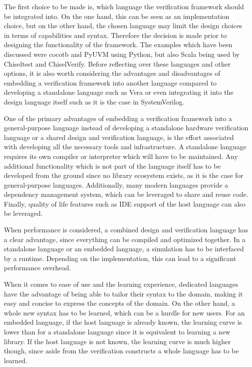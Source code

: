 The first choice to be made is, which language the verification framework should be integrated into. On the one hand,
this can be seen as an implementation choice, but on the other hand, the chosen language may limit the design choices
in terms of capabilities and syntax. Therefore the decision is made prior to designing the functionality of the
framework. The examples
which have been discussed were cocotb and PyUVM using Python, but also Scala being used by Chiseltest and
ChiselVerify. Before reflecting over these languages and other options, it is also worth considering the advantages
and disadvantages of embedding a verification framework into another language compared to developing a standalone
language such as Vera or even integrating it into the design language itself such as it is the case in SystemVerilog.

One of the primary advantages of embedding a verification framework into a general-purpose language instead of
developing a standalone hardware verification language or a shared design and verification language, is the effort
associated with developing all the necessary tools and infrastructure. A standalone language requires its own
compiler or interpreter which will have to be maintained. Any additional functionality which is not part of the
language itself has to be developed from the ground since no library ecosystem exists, as it is the case for
general-purpose languages. Additionally, many modern languages provide a dependency management system, which can be
leveraged to share and reuse code. Finally, quality of life features such as IDE support of the host language can
also be leveraged.

When performance is considered, a combined design and verification language has a clear advantage, since everything
can be compiled and optimized together. In a standalone language or an embedded language, a simulation has to be
interfaced by a runtime. Depending on the implementation, this can lead to a significant performance overhead.

When it comes to ease of use and the learning experience, dedicated languages have the advantage of being able to
tailor their syntax to the domain, making it easy and concise to express the concepts of the domain. On the other
hand, a whole new syntax has to be learned, which can be a hurdle for new users. For an embedded language, if the
host language is already known, the learning curve is lower than for a standalone language since it is equivalent to
learning a new library. If the host language is not known, the learning curve is much higher though, since aside from
the verification constructs a whole language has to be learned.

